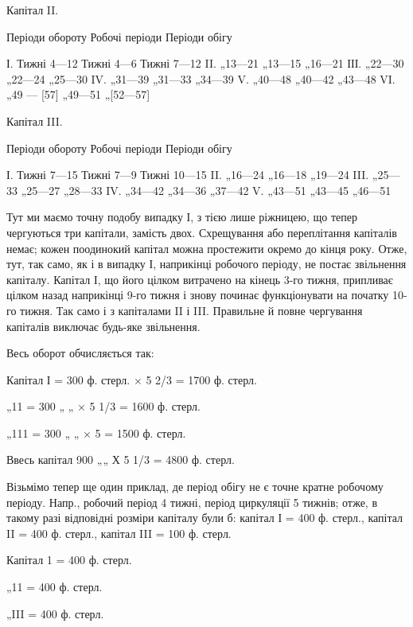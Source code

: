 Капітал II.

Періоди обороту    Робочі періоди    Періоди обігу

І. Тижні    4—12    Тижні 4—6    Тижні 7—12
II. „13—21 „13—15 „16—21
ІІІ. „22—30 „22—24 „25—30
IV. „31—39 „31—33 „34—39
V. „40—48 „40—42 „43—48
VI. „49 — [57] „49—51 „[52—57]

  Капітал III.

Періоди обороту    Робочі періоди    Періоди обігу

І. Тижні    7—15    Тижні 7—9    Тижні 10—15
II. „16—24 „16—18 „19—24
III. „25—33 „25—27 „28—33
IV. „34—42 „34—36 „37—42
V. „43—51 „43—45 „46—51

Тут ми маємо точну подобу випадку І, з тією лише ріжницею, що
тепер чергуються три капітали, замість двох. Схрещування або переплітання
капіталів немає; кожен поодинокий капітал можна простежити
окремо до кінця року. Отже, тут, так само, як і в випадку І, наприкінці
робочого періоду, не постає звільнення капіталу. Капітал І, що його цілком
витрачено на кінець 3-го тижня, припливає цілком назад наприкінці 9-го
тижня і знову починає функціонувати на початку 10-го тижня. Так само і з
капіталами II і III. Правильне й повне чергування капіталів виключає
будь-яке звільнення.

Весь оборот обчисляється так:

Капітал І = 300 ф. стерл. × 5 2/3 = 1700 ф. стерл.

„11 = 300 „ „   × 5 1/3 = 1600 ф. стерл.

„111 = 300 „ „    × 5 = 1500 ф. стерл.

Ввесь капітал   900 „„    Х 5 1/3 = 4800 ф. стерл.

Візьмімо тепер ще один приклад, де період обігу не є точне кратне
робочому періоду. Напр., робочий період 4 тижні, період циркуляції
5 тижнів; отже, в такому разі відповідні розміри капіталу були б:
капітал І = 400 ф. стерл., капітал II = 400 ф. стерл., капітал III = 100 ф. стерл.

Капітал 1 = 400 ф. стерл.

„11 = 400 ф. стерл.

„III = 400 ф. стерл.
